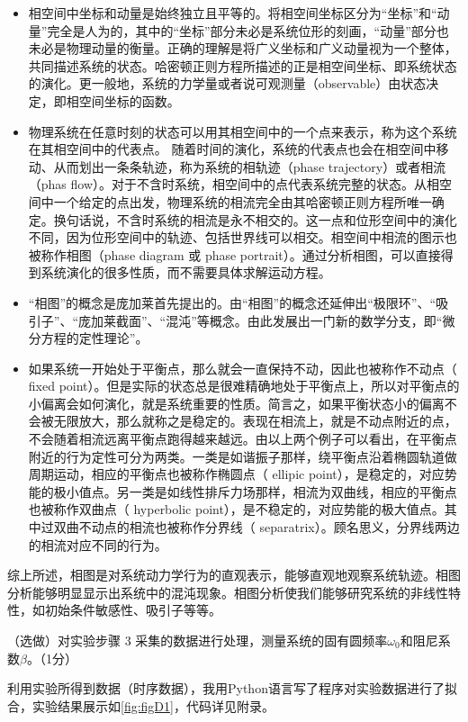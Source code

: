 \begin{itemize}
	\begin{itemize}
		\item 相空间中坐标和动量是始终独立且平等的。将相空间坐标区分为“坐标”和“动量”完全是人为的，其中的“坐标”部分未必是系统位形的刻画，“动量”部分也未必是物理动量的衡量。正确的理解是将广义坐标和广义动量视为一个整体，共同描述系统的状态。哈密顿正则方程所描述的正是相空间坐标、即系统状态的演化。更一般地，系统的力学量或者说可观测量（observable）由状态决定，即相空间坐标的函数。
		\item 物理系统在任意时刻的状态可以用其相空间中的一个点来表示，称为这个系统在其相空间中的代表点。
		随着时间的演化，系统的代表点也会在相空间中移动、从而划出一条条轨迹，称为系统的相轨迹（phase trajectory）或者相流（phas flow）。对于不含时系统，相空间中的点代表系统完整的状态。从相空间中一个给定的点出发，物理系统的相流完全由其哈密顿正则方程所唯一确定。换句话说，不含时系统的相流是永不相交的。这一点和位形空间中的演化不同，因为位形空间中的轨迹、包括世界线可以相交。相空间中相流的图示也被称作相图（phase diagram 或 phase portrait）。通过分析相图，可以直接得到系统演化的很多性质，而不需要具体求解运动方程。
		\item “相图”的概念是庞加莱首先提出的。由“相图”的概念还延伸出“极限环”、“吸引子”、“庞加莱截面”、“混沌”等概念。由此发展出一门新的数学分支，即“微分方程的定性理论”。
		\item 如果系统一开始处于平衡点，那么就会一直保持不动，因此也被称作不动点（ fixed point）。但是实际的状态总是很难精确地处于平衡点上，所以对平衡点的小偏离会如何演化，就是系统重要的性质。简言之，如果平衡状态小的偏离不会被无限放大，那么就称之是稳定的。表现在相流上，就是不动点附近的点，不会随着相流远离平衡点跑得越来越远。由以上两个例子可以看出，在平衡点附近的行为定性可分为两类。一类是如谐振子那样，绕平衡点沿着椭圆轨道做周期运动，相应的平衡点也被称作椭圆点（ ellipic point），是稳定的，对应势能的极小值点。另一类是如线性排斥力场那样，相流为双曲线，相应的平衡点也被称作双曲点（ hyperbolic point），是不稳定的，对应势能的极大值点。其中过双曲不动点的相流也被称作分界线（ separatrix）。顾名思义，分界线两边的相流对应不同的行为。
	\end{itemize}
	
	综上所述，相图是对系统动力学行为的直观表示，能够直观地观察系统轨迹。相图分析能够明显显示出系统中的混沌现象。相图分析使我们能够研究系统的非线性特性，如初始条件敏感性、吸引子等等。		
\end{itemize}

\begin{question}
	（选做）对实验步骤 3 采集的数据进行处理，测量系统的固有圆频率$\omega_0$和阻尼系数$\beta$。（1分）
\end{question}
利用实验所得到数据（时序数据），我用Python语言写了程序对实验数据进行了拟合，实验结果展示如\cref{fig:figD1}，代码详见附录。


